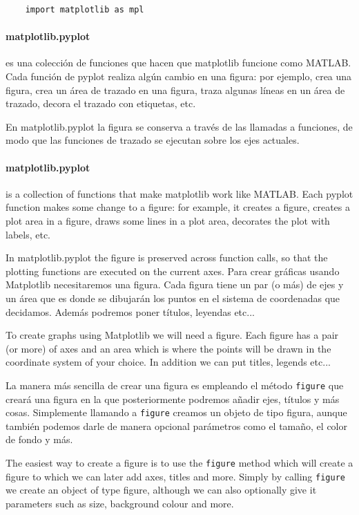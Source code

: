 \begin{verbatim}
    import matplotlib as mpl
\end{verbatim}
\begin{paracol}{2}
    \paragraph{matplotlib.pyplot} es una colección de funciones que hacen que matplotlib funcione como MATLAB. Cada función de pyplot realiza algún cambio en una figura: por ejemplo, crea una figura, crea un área de trazado en una figura, traza algunas líneas en un área de trazado, decora el trazado con etiquetas, etc.

    En matplotlib.pyplot la figura se conserva a través de las llamadas a funciones, de modo que las funciones de trazado se ejecutan sobre los ejes actuales.
    \switchcolumn
        \paragraph{matplotlib.pyplot} is a collection of functions that make matplotlib work like MATLAB. Each pyplot function makes some change to a figure: for example, it creates a figure, creates a plot area in a figure, draws some lines in a plot area, decorates the plot with labels, etc.

        In matplotlib.pyplot the figure is preserved across function calls, so that the plotting functions are executed on the current axes.
\switchcolumn
Para crear gráficas usando Matplotlib necesitaremos una figura. Cada figura tiene un par (o más) de ejes y un área que es donde se dibujarán los puntos en el sistema de coordenadas que decidamos. Además podremos poner títulos, leyendas etc...

\switchcolumn

To create graphs using Matplotlib we will need a figure. Each figure has a pair (or more) of axes and an area which is where the points will be drawn in the coordinate system of your choice. In addition we can put titles, legends etc...

\switchcolumn

La manera más sencilla de crear una figura es empleando el método \texttt{figure} que creará una figura en la que posteriormente podremos añadir ejes, títulos y más cosas. Simplemente llamando a \texttt{figure} creamos un objeto de tipo figura, aunque también podemos darle de manera opcional parámetros como el tamaño, el color de fondo y más.

\switchcolumn
The easiest way to create a figure is to use the \texttt{figure} method which will create a figure to which we can later add axes, titles and more. Simply by calling \texttt{figure} we create an object of type figure, although we can also optionally give it parameters such as size, background colour and more.
\end{paracol}

